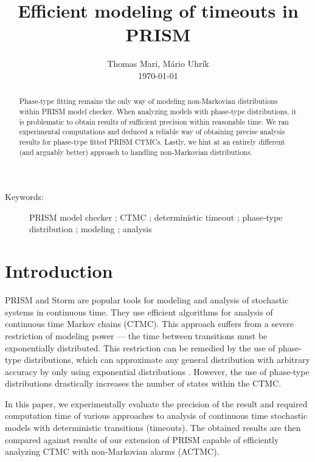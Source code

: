 \documentclass{article}
\title{
	Efficient modeling of timeouts in PRISM \\
}
\author{
	\normalfont 								\normalsize
	Thomas Mari, M\'{a}rio Uhr\'{i}k\\[-3pt]		\normalsize
	\today
}
\date{}
\numberwithin{equation}{section}		%
\numberwithin{figure}{section}			%
\numberwithin{table}{section}				%
\begin{document}
	\maketitle

	\begin{abstract}
		Phase-type fitting remains the only way of modeling non-Markovian distributions within PRISM model checker.
		When analyzing models with phase-type distributions, it is problematic to obtain results of sufficient precision within reasonable time.
		We ran experimental computations and deduced a reliable way of obtaining precise analysis results for phase-type fitted PRISM CTMCs.
		Lastly, we hint at an entirely different (and arguably better) approach to handling non-Markovian distributions.
	\end{abstract}
	
	\begin{description}
		
		\item[Keywords:] 	PRISM model checker ; CTMC ; deterministic timeout ; phase-type distribution ; modeling ; analysis
		
	\end{description}
	
	
	
	\section{Introduction}
	\label{intro}
	
	PRISM \cite{KNP11} and Storm \cite{DBLP:journals/corr/DehnertJK017} are popular tools for modeling and analysis of stochastic systems in continuous time. They use efficient algorithms for analysis of continuous time Markov chains (CTMC). This approach suffers from a severe restriction of modeling power --- the time between transitions must be exponentially distributed. This restriction can be remedied by the use of phase-type distributions, which can approximate any general distribution with arbitrary accuracy by only using exponential distributions \cite{Buchholz:2014:IMP:2683922}. However, the use of phase-type distributions drastically increases the number of states within the CTMC.
	
	In this paper, we experimentally evaluate the precision of the result and required computation time of various approaches to analysis of continuous time stochastic models with deterministic transitions (timeouts). The obtained results are then compared against results of our extension of PRISM capable of efficiently analyzing CTMC with non-Markovian alarms (ACTMC).
	
\end{document}
